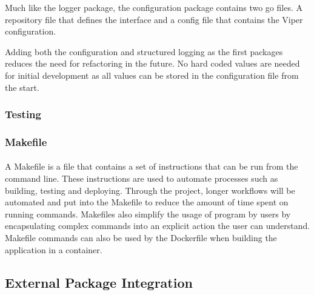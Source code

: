 \documentclass[12pt, conference, final, a4paper, onecolumn, compsoc]{IEEEtran}
\begin{document}
Much like the logger package, the configuration package contains two go files. A
repository file that defines the interface and a config file that contains the
Viper configuration.



Adding both the configuration and structured logging as the first packages
reduces the need for refactoring in the future. No hard coded values are needed
for initial development as all values can be stored in the configuration file
from the start.

\subsubsection*{Testing}
\paragraph{}


\subsubsection*{Makefile}
\paragraph{}

A Makefile is a file that contains a set of instructions that can be run from
the command line. These instructions are used to automate processes such as
building, testing and deploying. Through the project, longer workflows will be
automated and put into the Makefile to reduce the amount of time spent on
running commands. Makefiles also simplify the usage of program by users by
encapsulating complex commands into an explicit action the user can understand.
Makefile commands can also be used by the Dockerfile when building the
application in a container.




\subsection*{External Package Integration}
\paragraph{}
\end{document}
